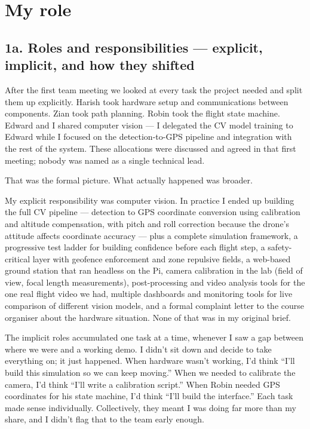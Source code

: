 \section{My role}


\subsection{1a. Roles and responsibilities --- explicit, implicit, and how they shifted}

After the first team meeting we looked at every task the project needed and split them up explicitly. Harish took hardware setup and communications between components. Zian took path planning. Robin took the flight state machine. Edward and I shared computer vision --- I delegated the CV model training to Edward while I focused on the detection-to-GPS pipeline and integration with the rest of the system. These allocations were discussed and agreed in that first meeting; nobody was named as a single technical lead.

That was the formal picture. What actually happened was broader.

My explicit responsibility was computer vision. In practice I ended up building the full CV pipeline --- detection to GPS coordinate conversion using calibration and altitude compensation, with pitch and roll correction because the drone's attitude affects coordinate accuracy --- plus a complete simulation framework, a progressive test ladder for building confidence before each flight step, a safety-critical layer with geofence enforcement and zone repulsive fields, a web-based ground station that ran headless on the Pi, camera calibration in the lab (field of view, focal length measurements), post-processing and video analysis tools for the one real flight video we had, multiple dashboards and monitoring tools for live comparison of different vision models, and a formal complaint letter to the course organiser about the hardware situation. None of that was in my original brief.

The implicit roles accumulated one task at a time, whenever I saw a gap between where we were and a working demo. I didn't sit down and decide to take everything on; it just happened. When hardware wasn't working, I'd think ``I'll build this simulation so we can keep moving.'' When we needed to calibrate the camera, I'd think ``I'll write a calibration script.'' When Robin needed GPS coordinates for his state machine, I'd think ``I'll build the interface.'' Each task made sense individually. Collectively, they meant I was doing far more than my share, and I didn't flag that to the team early enough.

